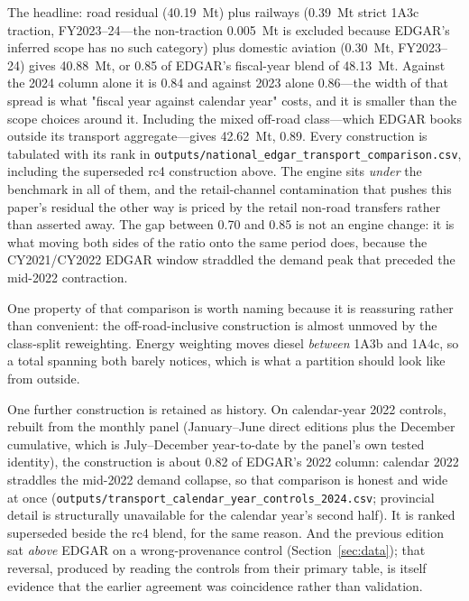 The headline: road residual (\SI{40.19}{\mega\tonne}) plus railways
(\SI{0.39}{\mega\tonne} strict 1A3c traction, FY2023--24---the non-traction
\SI{0.005}{\mega\tonne} is excluded because EDGAR's inferred scope has no such
category) plus domestic aviation (\SI{0.30}{\mega\tonne},
FY2023--24) gives \SI{40.88}{\mega\tonne}, or \num{0.85} of EDGAR's fiscal-year
blend of \SI{48.13}{\mega\tonne}. Against the 2024 column alone it is \num{0.84} and
against 2023 alone \num{0.86}---the width of that spread is what "fiscal year against
calendar year" costs, and it is smaller than the scope choices around it. Including the
mixed off-road class---which EDGAR books outside its transport aggregate---gives
\SI{42.62}{\mega\tonne}, \num{0.89}. Every construction is tabulated with its rank in
\texttt{outputs/national\_edgar\_transport\_comparison.csv}, including the superseded
rc4 construction above. The engine sits \emph{under} the benchmark in all of them, and
the retail-channel contamination that pushes this paper's residual the other way is
priced by the retail non-road transfers rather than asserted away. The gap between
\num{0.70} and \num{0.85} is not an engine change: it is what moving both sides of the
ratio onto the same period does, because the CY2021/CY2022 EDGAR window straddled the
demand peak that preceded the mid-2022 contraction.

One property of that comparison is worth naming because it is reassuring rather than
convenient: the off-road-inclusive construction is almost unmoved by the class-split
reweighting. Energy weighting moves diesel \emph{between} 1A3b and 1A4c, so a total
spanning both barely notices, which is what a partition should look like from outside.

One further construction is retained as history. On calendar-year 2022 controls,
rebuilt from the monthly panel (January--June direct editions plus the December
cumulative, which is July--December year-to-date by the panel's own tested identity), the
construction is about \num{0.82} of EDGAR's 2022 column: calendar 2022 straddles the
mid-2022 demand collapse, so that comparison is honest and wide at once
(\texttt{outputs/transport\_calendar\_year\_controls\_2024.csv}; provincial detail is
structurally unavailable for the calendar year's second half). It is ranked superseded
beside the rc4 blend, for the same reason. And the previous edition
sat \emph{above} EDGAR on a wrong-provenance control (Section~\ref{sec:data}); that
reversal, produced by reading the controls from their primary table, is itself evidence
that the earlier agreement was coincidence rather than validation.

